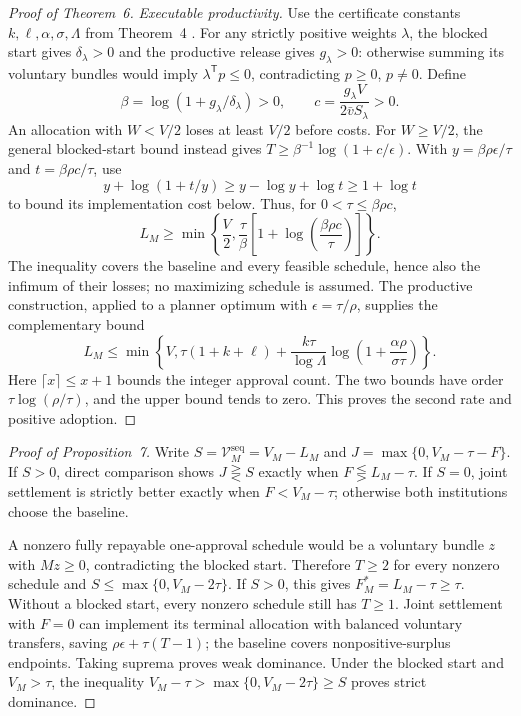 \documentclass[ecta,draft,supplement]{econsocart}
\theoremstyle{definition}
\theoremstyle{definition}
\begin{document}
\begin{appendix}
\begin{proof}[Proof of Theorem~6%
]
\emph{Executable productivity.} Use the certificate constants
$k,\ell,\alpha,\sigma,\Lambda$ from
Theorem~4%
. For any strictly positive weights
$\lambda$, the blocked start gives $\delta_\lambda>0$ and the
productive release gives $g_\lambda>0$: otherwise summing its voluntary
bundles would imply $\lambda^{\mathsf T}p\leq0$, contradicting
$p\geq0$, $p\ne0$. Define
\[
 \beta=\log(1+g_\lambda/\delta_\lambda)>0,\qquad
 c=\frac{g_\lambda V}{2\bar vS_\lambda}>0.
\]
An allocation with $W<V/2$ loses at least $V/2$ before costs. For
$W\geq V/2$, the general blocked-start bound instead gives
$T\geq\beta^{-1}\log(1+c/\epsilon)$. With
$y=\beta\rho\epsilon/\tau$ and $t=\beta\rho c/\tau$, use
\[
 y+\log(1+t/y)\geq y-\log y+\log t\geq1+\log t
\]
to bound its implementation cost below. Thus, for
$0<\tau\leq\beta\rho c$,
\[
 L_M\geq\min\left\{\frac V2,
  \frac\tau\beta\left[1+\log\left(\frac{\beta\rho c}{\tau}\right)
                  \right]\right\}.
\]
The inequality covers the baseline and every feasible schedule, hence
also the infimum of their losses; no maximizing schedule is assumed.
The productive construction, applied to a planner optimum with
$\epsilon=\tau/\rho$, supplies the complementary bound
\[
 L_M\leq\min\left\{V,\tau(1+k+\ell)
  +\frac{k\tau}{\log\Lambda}
       \log\left(1+\frac{\alpha\rho}{\sigma\tau}\right)\right\}.
\]
Here $\lceil x\rceil\leq x+1$ bounds the integer approval count.
The two bounds have order $\tau\log(\rho/\tau)$, and the upper
bound tends to zero. This proves the second rate and positive adoption.
\end{proof}

\begin{proof}[Proof of Proposition~7%
]
Write $S=\mathcal V_M^{\mathrm{seq}}=V_M-L_M$ and
$J=\max\{0,V_M-\tau-F\}$. If $S>0$, direct comparison shows
$J\gtreqless S$ exactly when $F\lesseqgtr L_M-\tau$. If $S=0$,
joint settlement is strictly better exactly when $F<V_M-\tau$;
otherwise both institutions choose the baseline.

A nonzero fully repayable one-approval schedule would be a voluntary
bundle $z$ with $Mz\geq0$, contradicting the blocked start. Therefore
$T\geq2$ for every nonzero schedule and
$S\leq\max\{0,V_M-2\tau\}$. If $S>0$, this gives
$F_M^*=L_M-\tau\geq\tau$. Without a blocked start, every nonzero
schedule still has $T\geq1$. Joint settlement with $F=0$ can implement
its terminal allocation with balanced voluntary transfers, saving
$\rho\epsilon+\tau(T-1)$; the baseline covers nonpositive-surplus
endpoints. Taking suprema proves weak dominance. Under the blocked
start and $V_M>\tau$, the inequality
$V_M-\tau>\max\{0,V_M-2\tau\}\geq S$ proves strict dominance.
\end{proof}


\end{appendix}
\end{document}
